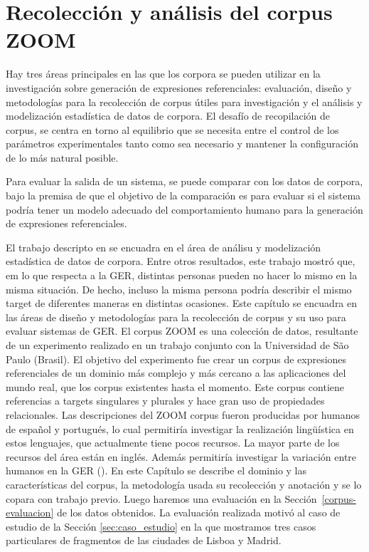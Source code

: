 \chapter{Recolecci\'on y an\'alisis del corpus ZOOM}
\label{sec:corpus}

Hay tres \'areas principales en las que los corpora se pueden utilizar en la investigaci\'on sobre generaci\'on de expresiones referenciales:
evaluaci\'on, dise\~no y metodolog\'ias para la recolecci\'on de corpus \'utiles para investigaci\'on y el an\'alisis y modelizaci\'on estad\'istica de datos de corpora.
El desaf\'io de recopilaci\'on de corpus, se centra en torno al equilibrio que se necesita
entre el control de los par\'ametros experimentales tanto como sea necesario
y mantener la configuraci\'on de lo m\'as natural posible. 

Para evaluar la salida de un sistema, se puede 
comparar con los datos de corpora, bajo la premisa de que el objetivo de la comparaci\'on es
para evaluar si el sistema podr\'ia tener un modelo adecuado del comportamiento humano para la generaci\'on de expresiones referenciales.


El trabajo descripto en \cite{viethen} se encuadra en el \'area de an\'alisu y modelizaci\'on estad\'istica de datos de corpora. Entre otros resultados, este trabajo mostr\'o que, em lo que respecta a la GER, distintas personas pueden no  hacer lo mismo en la misma situaci\'on. De hecho, incluso la misma persona podr\'ia describir el mismo target de diferentes maneras en distintas ocasiones.
Este cap\'itulo se encuadra en las \'areas de dise\~no y metodolog\'ias para la recolecci\'on de corpus y su uso para evaluar sistemas de GER.
El corpus ZOOM es una colecci\'on de datos, resultante de un experimento realizado en un trabajo conjunto con la Universidad de S\~ao Paulo (Brasil). El objetivo del experimento fue crear un corpus de expresiones referenciales de un dominio m\'as complejo y m\'as cercano a las aplicaciones del mundo real, que los corpus existentes hasta el momento. Este corpus contiene referencias a targets singulares y plurales y hace gran uso de propiedades relacionales. Las descripciones del ZOOM corpus fueron producidas por humanos de espa\~nol y portugu\'es, lo cual permitir\'ia investigar la realizaci\'on ling\"u\'istica en estos lenguajes, que actualmente tiene pocos recursos. La mayor parte de los recursos del \'area est\'an en ingl\'es. Adem\'as permitir\'ia investigar la variaci\'on entre humanos en la GER (\cite{trainable-speaker,romina-coling,non-det}). 
En este Cap\'itulo se describe el dominio y las caracter\'isticas del corpus, la metodolog\'ia usada su recolecci\'on y anotaci\'on y se lo copara con trabajo previo. Luego haremos una evaluaci\'on en la Secci\'on~\ref{corpus-evaluacion} de los datos obtenidos. La evaluaci\'on realizada motiv\'o al caso de estudio de la Secci\'on \ref{sec:caso_estudio} en la que mostramos tres casos particulares de fragmentos de las ciudades de Lisboa y Madrid.


